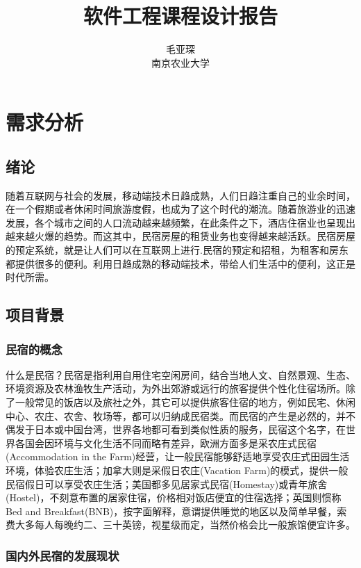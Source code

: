 \documentclass[lang=cn,11pt,a4paper,cite=authoryear]{elegantpaper}
\title{软件工程课程设计报告}
\author{毛亚琛 \\ 南京农业大学}
\date{\zhtoday}
\begin{document}
\maketitle

\section{需求分析}

\subsection{绪论}

随着互联网与社会的发展，移动端技术日趋成熟，人们日趋注重自己的业余时间，在一个假期或者休闲时间旅游度假，也成为了这个时代的潮流。随着旅游业的迅速发展，各个城市之间的人口流动越来越频繁，在此条件之下，酒店住宿业也呈现出越来越火爆的趋势。而这其中，民宿房屋的租赁业务也变得越来越活跃。民宿房屋的预定系统，就是让人们可以在互联网上进行.民宿的预定和招租，为租客和房东都提供很多的便利。利用日趋成熟的移动端技术，带给人们生活中的便利，这正是时代所需。

\subsection{项目背景}

\subsubsection{民宿的概念}

什么是民宿？民宿是指利用自用住宅空闲房间，结合当地人文、自然景观、生态、环境资源及农林渔牧生产活动，为外出郊游或远行的旅客提供个性化住宿场所。除了一般常见的饭店以及旅社之外，其它可以提供旅客住宿的地方，例如民宅、休闲中心、农庄、农舍、牧场等，都可以归纳成民宿类。而民宿的产生是必然的，并不偶发于日本或中国台湾，世界各地都可看到类似性质的服务，民宿这个名字，在世界各国会因环境与文化生活不同而略有差异，欧洲方面多是采农庄式民宿(Accommodation in the Farm)经营，让一般民宿能够舒适地享受农庄式田园生活环境，体验农庄生活；加拿大则是采假日农庄(Vacation Farm)的模式，提供一般民宿假日可以享受农庄生活；美国都多见居家式民宿(Homestay)或青年旅舍(Hostel)，不刻意布置的居家住宿，价格相对饭店便宜的住宿选择；英国则惯称Bed and Breakfast(BNB)，按字面解释，意谓提供睡觉的地区以及简单早餐，索费大多每人每晚约二、三十英镑，视星级而定，当然价格会比一般旅馆便宜许多。

\subsubsection{国内外民宿的发展现状}
\end{document}
